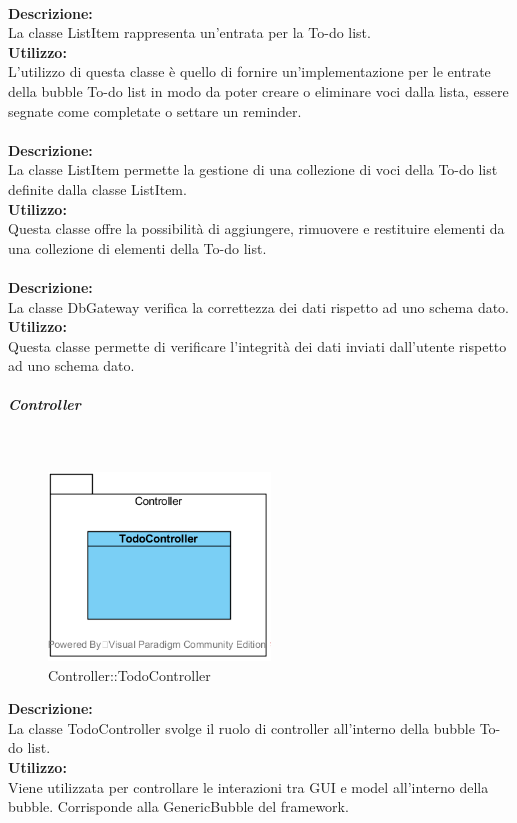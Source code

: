 \label{todo-item}\mbox{}\\
\textbf{Descrizione:}\\
La classe List\-Item rappresenta un'entrata per la To-do list.\\
\textbf{Utilizzo:}\\
L'utilizzo di questa classe è quello di fornire un'implementazione per le entrate della bubble To-do list in modo da poter creare o eliminare voci dalla lista, essere segnate come completate o settare un reminder.\\

\label{todo-container}\mbox{}\\
\textbf{Descrizione:}\\
La classe List\-Item permette la gestione di una collezione di voci della To-do list definite dalla classe List\-Item.\\
\textbf{Utilizzo:}\\
Questa classe offre la possibilità di aggiungere, rimuovere e restituire elementi da una collezione di elementi della To-do list.\\


\label{todo-gateway}\mbox{}\\
\textbf{Descrizione:}\\
La classe Db\-Gateway verifica la correttezza dei dati rispetto ad uno schema dato.
\textbf{Utilizzo:}\\
Questa classe permette di verificare l'integrità dei dati inviati dall'utente rispetto ad uno schema dato.

\subparagraph{Controller}\mbox{}
\begin{samepage}
	\label{todo-controller}\mbox{}\\
	\nopagebreak
	\begin{figure}[H]
		\centering
		\includegraphics[height=5cm]{diagrammi_img/classi_e_package/todo_controller}
		\caption{Controller\-::Todo\-Controller}
	\end{figure}
\end{samepage}
\textbf{Descrizione:}\\
La classe TodoController svolge il ruolo di controller all'interno della bubble To-do list. \\
\textbf{Utilizzo:}\\
Viene utilizzata per controllare le interazioni tra GUI e model all'interno della bubble. Corrisponde alla GenericBubble del framework. \\